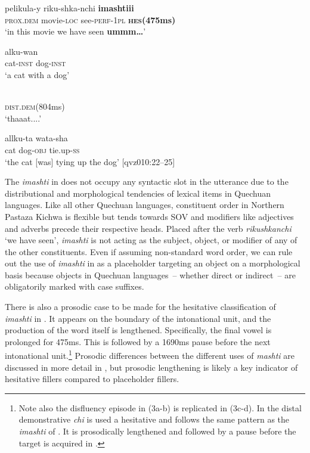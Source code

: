\documentclass[output=paper]{langscibook}
\begin{document}
\ea \label{ex:rice:3}
\ea \label{ex:rice:3a}
 {pelikula-y} {riku-shka-nchi} {\textbf{imashtiii}} {}\\
{\textsc{prox.dem}}  {movie-\textsc{loc}}  {see-\textsc{perf-1pl}}   {\textbf{\textsc{hes}}\textbf{(475ms)}}\\
\glt ‘in this movie we have seen \textbf{ummm…}’
\medskip

\ex \label{ex:rice:3b} 
     {alku-wan} {}\\
    {cat-\textsc{inst}}  {dog-\textsc{inst}} {}\\
    \glt ‘a cat with a dog’
\medskip

\ex \label{ex:rice:3c}
 {}\\
{\textsc{dist.dem(804}ms)} {}\\
\glt ‘thaaat....’
\medskip

\ex \label{ex:rice:3d}
  {allku-ta}  {wata-sha}\\
{cat}  {dog-\textsc{obj}}  {tie.up-\textsc{ss}}\\
\glt ‘the cat [was] tying up the dog’ [qvz010:22--25]
\z
\z

The \textit{imashti} in  does not occupy any syntactic slot in the utterance due to the distributional and morphological tendencies of lexical items in Quechuan languages. Like all other Quechuan languages, constituent order in Northern Pastaza Kichwa is flexible but tends towards SOV and modifiers like adjectives and adverbs precede their respective heads. Placed after the verb \textit{rikushkanchi} ‘we have seen’, \textit{imashti} is not acting as the subject, object, or modifier of any of the other constituents. Even if assuming non-standard word order, we can rule out the use of \textit{imashti} in  as a placeholder targeting an object on a morphological basis because objects in Quechuan languages~-- whether direct or indirect~-- are obligatorily marked with case suffixes.

There is also a prosodic case to be made for the hesitative classification of \textit{imashti} in . It appears on the boundary of the intonational unit, and the production of the word itself is lengthened. Specifically, the final vowel is prolonged for 475ms. This is followed by a 1690ms pause before the next intonational unit.\footnote{Note also the disfluency episode in (3a-b) is replicated in (3c-d). In  the distal demonstrative \textit{chi} is used a hesitative and follows the same pattern as the \textit{imashti} of . It is prosodically lengthened and followed by a pause before the target is acquired in .} Prosodic differences between the different uses of \textit{mashti} are discussed in more detail in , but prosodic lengthening is likely a key indicator of hesitative fillers compared to placeholder fillers. 
\end{document}
